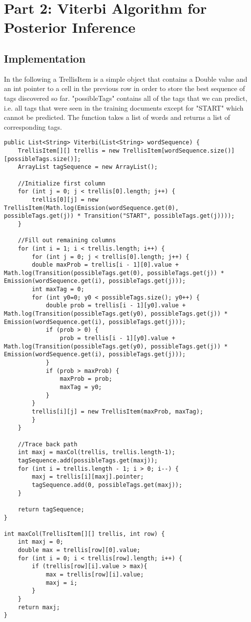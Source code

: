 \documentclass[paper=a4, fontsize=11pt]{jhwhw} %
\begin{document}
\section{Part 2: Viterbi Algorithm for Posterior Inference}
\subsection{Implementation}
In the following a TrellisItem is a simple object that contains a Double value and an int pointer to a 
cell in the previous row in order to store the best sequence of tags discovered so far. "possibleTags" contains all of the tags that we can predict, i.e. all tags that were
seen in the training documents except for "START" which cannot be predicted. The function
takes a list of words and returns a list of corresponding tags. 
\begin{lstlisting}[basicstyle=\small]
public List<String> Viterbi(List<String> wordSequence) {
	TrellisItem[][] trellis = new TrellisItem[wordSequence.size()][possibleTags.size()];
	ArrayList tagSequence = new ArrayList();

	//Initialize first column
	for (int j = 0; j < trellis[0].length; j++) {
	    trellis[0][j] = new TrellisItem(Math.log(Emission(wordSequence.get(0), possibleTags.get(j)) * Transition("START", possibleTags.get(j))));
	}

	//Fill out remaining columns
	for (int i = 1; i < trellis.length; i++) {
	    for (int j = 0; j < trellis[0].length; j++) {
		double maxProb = trellis[i - 1][0].value + Math.log(Transition(possibleTags.get(0), possibleTags.get(j)) * Emission(wordSequence.get(i), possibleTags.get(j)));
		int maxTag = 0;
		for (int y0=0; y0 < possibleTags.size(); y0++) {
		    double prob = trellis[i - 1][y0].value + Math.log(Transition(possibleTags.get(y0), possibleTags.get(j)) * Emission(wordSequence.get(i), possibleTags.get(j)));
		    if (prob > 0) {
		        prob = trellis[i - 1][y0].value + Math.log(Transition(possibleTags.get(y0), possibleTags.get(j)) * Emission(wordSequence.get(i), possibleTags.get(j)));
		    }
		    if (prob > maxProb) {
		        maxProb = prob;
		        maxTag = y0;
		    }
		}
		trellis[i][j] = new TrellisItem(maxProb, maxTag);
	    }
	}

	//Trace back path
	int maxj = maxCol(trellis, trellis.length-1);
	tagSequence.add(possibleTags.get(maxj));
	for (int i = trellis.length - 1; i > 0; i--) {
	    maxj = trellis[i][maxj].pointer;
	    tagSequence.add(0, possibleTags.get(maxj));
	}

	return tagSequence;
}

int maxCol(TrellisItem[][] trellis, int row) {
	int maxj = 0;
	double max = trellis[row][0].value;
	for (int i = 0; i < trellis[row].length; i++) { 
	    if (trellis[row][i].value > max){ 
			max = trellis[row][i].value;
			maxj = i;
	    }
	}
	return maxj;
}

\end{lstlisting}
\end{document}
